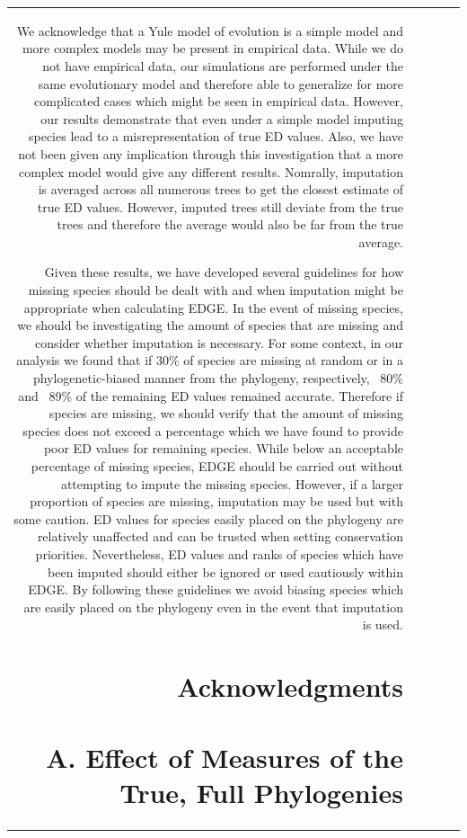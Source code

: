 \documentclass[12pt,english]{article}
\begin{document}
\begin{table}[ht]
\begin{tabular}{rrrrr}
We acknowledge that a Yule model of evolution is a simple model and more complex
models may be present in empirical data. While we do not have empirical data,
our simulations are performed under the same evolutionary model and therefore
able to generalize for more complicated cases which might be seen in empirical
data. However, our results demonstrate that even under a simple model imputing
species lead to a misrepresentation of true ED values. Also, we have not been
given any implication through this investigation that a more complex model would
give any different results. Nomrally, imputation is averaged across all numerous
trees to get the closest estimate of true ED values. However, imputed trees
still deviate from the true trees and therefore the average would also be far
from the true average.

Given these results, we have developed several guidelines for how missing
species should be dealt with and when imputation might be appropriate when
calculating EDGE. In the event of missing species, we should be investigating
the amount of species that are missing and consider whether imputation is
necessary. For some context, in our analysis we found that if 30\% of species
are missing at random or in a phylogenetic-biased manner from the phylogeny,
respectively, ~80\% and ~89\% of the remaining ED values remained accurate.
Therefore if species are missing, we should verify that the amount of missing
species does not exceed a percentage which we have found to provide poor ED
values for remaining species. While below an acceptable percentage of missing
species, EDGE should be carried out without attempting to impute the
missing species. However, if a larger proportion of species are missing,
imputation may be used but with some caution. ED values for species easily
placed on the phylogeny are relatively unaffected and can be trusted when
setting conservation priorities. Nevertheless, ED values and ranks of species
which have been imputed should either be ignored or used cautiously within EDGE.
By following these guidelines we avoid biasing species which are easily placed
on the phylogeny even in the event that imputation is used.

\section*{Acknowledgments}

\clearpage
\printbibliography

\clearpage
\appendix
\section*{A. Effect of Measures of the True, Full Phylogenies}


\end{tabular}
\end{table}
\end{document}
